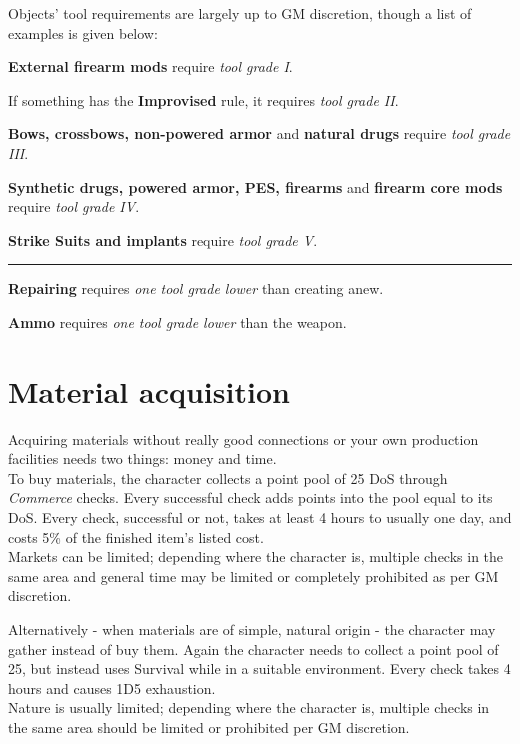 \documentclass[12pt,a4paper,openany,usenames,dvipsnames]{book}
\begin{document}
	Objects’ tool requirements are largely up to GM discretion, though a list of examples is given below:
	\begin{sitemize}[8]
		\item \textbf{External firearm mods} require \emph{tool grade I}.
		\item If something has the \textbf{Improvised} rule, it requires \emph{tool grade II}.
		\item \textbf{Bows, crossbows, non-powered armor} and \textbf{natural drugs} require \emph{tool grade III}.
		\item \textbf{Synthetic drugs, powered armor, PES, firearms} and \textbf{firearm core mods} require \emph{tool grade IV}.
		\item \textbf{Strike Suits and implants} require \emph{tool grade V}.
		\hrule
		\item \textbf{Repairing} requires \emph{one tool grade lower} than creating anew.
		\item \textbf{Ammo} requires \emph{one tool grade lower} than the weapon.
	\end{sitemize}
	
	\chapter{Material acquisition}
	Acquiring materials without really good connections or your own production facilities needs two things: money and time.\\
	To buy materials, the character collects a point pool of 25 DoS through \emph{Commerce} checks.
	Every successful check adds points into the pool equal to its DoS.
	Every check, successful or not,
		takes at least 4 hours to usually one day,
		and costs 5\% of the finished item’s listed cost.\\
	Markets can be limited; depending where the character is, multiple checks in the same area and general time may be limited or completely prohibited as per GM discretion. \par
	Alternatively - when materials are of simple, natural origin - the character may gather instead of buy them.
	Again the character needs to collect a point pool of 25,
		but instead uses Survival while in a suitable environment.
	Every check takes 4 hours and causes 1D5 exhaustion.\\
	Nature is usually limited; depending where the character is, multiple checks in the same area should be limited or prohibited per GM discretion.
\end{document}
